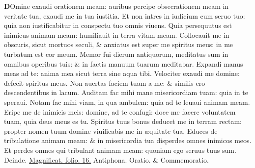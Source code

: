 \documentclass[a5paper,10pt]{book}
\def\ae{æ}
\begin{document}
\begin{multicols*}{2}
\vspace{-1em}
\lettrine[lines=2]{\bfseries \color{red} D}{}Omine exaudi orationem meam: auribus percipe obsecrationem meam in veritate tua, exaudi me in tua iustitia.
\newline \color{red} E\color{black}t non intres in iudicium cum seruo tuo: quia non iustificabitur in conspectu tuo omnis viuens.
\newline \color{red} Q\color{black}uia persequutus est inimicus animam meam: humiliauit in terra vitam meam.
\newline \color{red} C\color{black}ollocauit me in obscuris, sicut mortuos seculi, \& anxiatus est super me spiritus meus: in me turbatum est cor meum.
\newline \color{red} M\color{black}emor fui dierum antiquorum, meditatus sum in omnibus operibus tuis: \& in factis manuum tuarum meditabar.
\newline \color{red} E\color{black}xpandi manus meas ad te: anima mea sicut terra sine aqua tibi.
\newline \color{red} V\color{black}elociter exaudi me domine: defecit spiritus meus.
\newline \color{red} N\color{black}on auertas faciem tuam a me: \& similis ero descendentibus in lacum.
\newline \color{red} A\color{black}uditam fac mihi mane misericordiam tuam: quia in te speraui.
\newline \color{red} N\color{black}otam fac mihi viam, in qua ambulem: quia ad te leuaui animam meam.
\newline \color{red} E\color{black}ripe me de inimicis meis: domine, ad te confugi: doce me facere voluntatem tuam, quia deus meus es tu.
\newline \color{red} S\color{black}piritus tuus bonus deducet me in terram rectam: propter nomen tuum domine viuificabis me in \ae quitate tua.
\newline \color{red} E\color{black}duces de tribulatione animam meam: \& in misericordia tua disperdes omnes inimicos meos.%
\newline \color{red} E\color{black}t perdes omnes qui tribulant animam meam: quoniam ego seruus tuus sum.
\newline \color{red} Deinde. \color{black} \hyperlink{Magnificat}{Magnificat. folio. 16.}
\newline \color{red} Antiphona. Oratio. \& Commemoratio. \color{black}
\vspace{-2em}

\end{multicols*}
\end{document}
